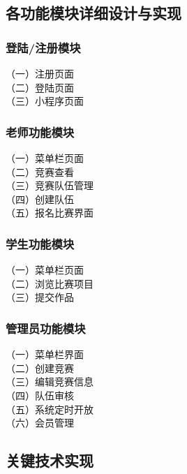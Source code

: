 \documentclass[a4paper]{ltxdoc}
\begin{document}
{		\subsection{各功能模块详细设计与实现}
		
		\subsubsection{登陆/注册模块}
		
		（一）注册页面\\
		（二）登陆页面\\
		（三）小程序页面\\
		
		\subsubsection{老师功能模块}
		
		（一）菜单栏页面\\
		（二）竞赛查看\\
		（三）竞赛队伍管理\\
		（四）创建队伍\\
		（五）报名比赛界面\\
		
		\subsubsection{学生功能模块}
		
		（一）菜单栏页面\\
		（二）浏览比赛项目\\
		（三）提交作品\\
		
		\subsubsection{管理员功能模块}
		
		（一）菜单栏界面\\
		（二）创建竞赛\\
		（三）编辑竞赛信息\\
		（四）队伍审核\\
		（五）系统定时开放\\
		（六）会员管理\\
		
		
		
		\subsection{关键技术实现}
		
}
\end{document}
